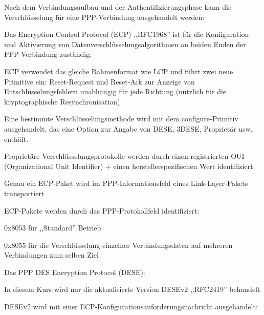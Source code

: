\documentclass[a4paper]{article}
\begin{document}
\begin{multicols}{3}
      \begin{itemize*}
            \item Nach dem Verbindungsaufbau und der Authentifizierungsphase kann die
            Verschlüsselung für eine PPP-Verbindung ausgehandelt werden:
            \begin{itemize*}
                  \item Das Encryption Control Protocol (ECP) ,,RFC1968'' ist für die Konfiguration und Aktivierung von Datenverschlüsselungsalgorithmen an beiden Enden der PPP-Verbindung zuständig:
                  \begin{itemize*} \item ECP verwendet das gleiche Rahmenformat wie LCP und führt zwei neue Primitive ein: Reset-Request und Reset-Ack zur Anzeige von Entschlüsselungsfehlern unabhängig für jede Richtung (nützlich für die kryptographische Resynchronisation) \item Eine bestimmte Verschlüsselungsmethode wird mit dem configure-Primitiv ausgehandelt, das eine Option zur Angabe von DESE, 3DESE, Proprietär usw. enthält. \item Proprietäre Verschlüsselungsprotokolle werden durch einen registrierten OUI (Organizational Unit Identifier) + einen herstellerspezifischen Wert identifiziert. \item Genau ein ECP-Paket wird im PPP-Informationsfeld eines Link-Layer-Pakets transportiert \item ECP-Pakete werden durch das PPP-Protokollfeld identifiziert:
                        \begin{itemize*} \item 0x8053 für ,,Standard'' Betrieb \item 0x8055 für die Verschlüsselung einzelner Verbindungsdaten auf mehreren Verbindungen zum selben Ziel \end{itemize*} \end{itemize*}
            \end{itemize*}
            \item Das PPP DES Encryption Protocol (DESE):
            \begin{itemize*}
                  \item In diesem Kurs wird nur die aktualisierte Version DESEv2 ,,RFC2419'' behandelt
                  \item DESEv2 wird mit einer ECP-Konfigurationsanforderungsnachricht ausgehandelt:

\end{itemize*}
\end{itemize*}
\end{multicols}
\end{document}
